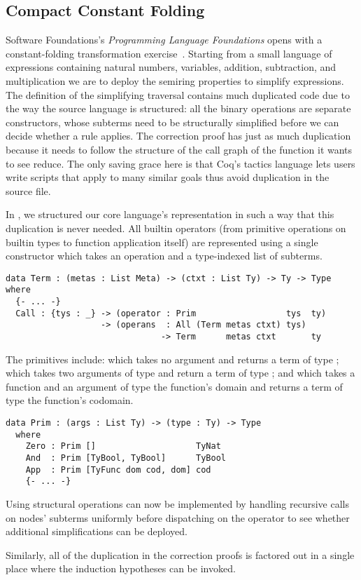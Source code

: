 \subsection{Compact Constant Folding}
\label{sec:design:constants}

Software Foundations's \emph{Programming Language Foundations} opens with a constant-folding transformation exercise~\cite[Chapter~1]{Pierce:SF2}.
%
Starting from a small language of expressions containing natural numbers, variables, addition, subtraction, and multiplication we are to deploy the semiring properties to simplify expressions.
%
The definition of the simplifying traversal contains much duplicated code due to the way the source language is structured:
all the binary operations are separate constructors, whose subterms need to be structurally simplified before we can decide whether a rule applies.
%
The correction proof has just as much duplication because it needs to follow
the structure of the call graph of the function it wants to see reduce.
%
The only saving grace here is that Coq's tactics language lets users write scripts that apply to many similar goals thus avoid duplication in the source file.

In \Velo{}, we structured our core language's representation in such a way that
this duplication is never needed.
%
All builtin operators (from primitive operations on builtin types to function
application itself) are represented using a single  constructor
which takes an operation and a type-indexed list of subterms.

\begin{verbatim}
data Term : (metas : List Meta) -> (ctxt : List Ty) -> Ty -> Type where
  {- ... -}
  Call : {tys : _} -> (operator : Prim                  tys  ty)
                   -> (operans  : All (Term metas ctxt) tys)
                               -> Term      metas ctxt       ty
\end{verbatim}

The primitives include:
%
 which takes no argument and returns a term of type ;
%
 which takes two arguments of type  and return a term
of type ;
%
and
%
 which takes a function and an argument of type the function's domain
and returns a term of type the function's codomain.

\begin{verbatim}
data Prim : (args : List Ty) -> (type : Ty) -> Type
  where
    Zero : Prim []                    TyNat
    And  : Prim [TyBool, TyBool]      TyBool
    App  : Prim [TyFunc dom cod, dom] cod
    {- ... -}
\end{verbatim}

Using  structural operations can now be implemented by handling recursive calls on  nodes' subterms uniformly before dispatching on the operator to see whether additional simplifications can be deployed.

Similarly, all of the duplication in the correction proofs is factored out in a single place where the induction hypotheses can be invoked.


